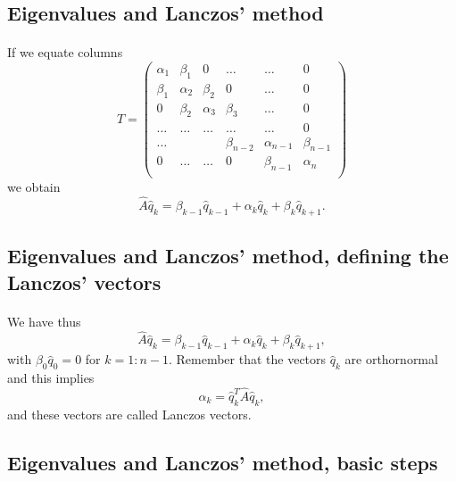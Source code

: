 \subsection*{Eigenvalues and Lanczos' method}

\paragraph{}
If we equate columns 
\[
\hat{T} = \left(\begin{array}{cccccc}
        \alpha_1& \beta_1 & 0 &\dots   & \dots &0 \\
        \beta_1 & \alpha_2 & \beta_2 &0 &\dots &0 \\
        0& \beta_2 & \alpha_3 & \beta_3 & \dots &0 \\
        \dots& \dots   & \dots &\dots   &\dots & 0 \\
        \dots&   &  &\beta_{n-2}  &\alpha_{n-1}& \beta_{n-1} \\
        0&  \dots  &\dots  &0   &\beta_{n-1} & \alpha_{n} \\
        \end{array} \right)
\]
we obtain
\[
\hat{A}\hat{q}_k=\beta_{k-1}\hat{q}_{k-1}+\alpha_k\hat{q}_k+\beta_k\hat{q}_{k+1}.
\]



\subsection*{Eigenvalues and Lanczos' method, defining the Lanczos' vectors}

\paragraph{}
We have thus
\[
\hat{A}\hat{q}_k=\beta_{k-1}\hat{q}_{k-1}+\alpha_k\hat{q}_k+\beta_k\hat{q}_{k+1},
\]
with $\beta_0\hat{q}_0=0$ for $k=1:n-1$. Remember that the vectors $\hat{q}_k$  are orthornormal and this implies
\[
\alpha_k=\hat{q}_k^T\hat{A}\hat{q}_k,
\]
and these vectors are called Lanczos vectors.



\subsection*{Eigenvalues and Lanczos' method, basic steps}

